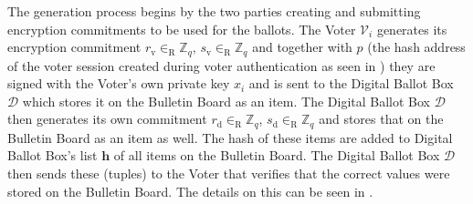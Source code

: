 
The generation process begins by the two parties creating and submitting encryption commitments to be used for the ballots. The Voter $\mathcal{V}_i$ generates its encryption commitment $r_\mathrm{v} \in_\mathrm{R} \mathbb{Z}_q$, $s_\mathrm{v} \in_\mathrm{R} \mathbb{Z}_q$ and together with $p$ (the hash address of the voter session created during voter authentication as seen in ) they are signed with the Voter's own private key $x_i$ and is sent to the Digital Ballot Box $\mathcal{D}$ which stores it on the Bulletin Board as an item. The Digital Ballot Box $\mathcal{D}$ then generates its own commitment $r_\mathrm{d} \in_\mathrm{R} \mathbb{Z}_q$, $s_\mathrm{d} \in_\mathrm{R} \mathbb{Z}_q$ and stores that on the Bulletin Board as an item as well. The hash of these items are added to Digital Ballot Box's list $\boldsymbol{h}$ of all items on the Bulletin Board. The Digital Ballot Box $\mathcal{D}$ then sends these (tuples) to the Voter that verifies that the correct values were stored on the Bulletin Board. The details on this can be seen in .

